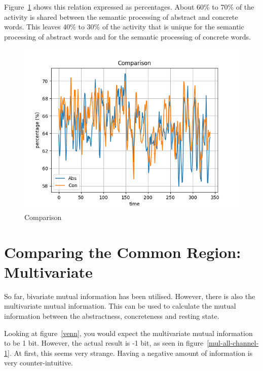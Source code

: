 Figure~\ref{comp-1} shows this relation expressed as percentages. About 60\% to 70\% of the activity is shared between the semantic processing of abstract and concrete words. This leaves 40\% to 30\% of the activity that is unique for the semantic processing of abstract words and for the semantic processing of concrete words.

\begin{figure}[!htb]
\caption{Comparison}
\label{comp-1}
    \centering
    \includegraphics[width=\textwidth]{fig/comp-1}
\end{figure}

\section{Comparing the Common Region: Multivariate}\label{analysis2}

So far, bivariate mutual information has been utilised. However, there is also the multivariate mutual information. This can be used to calculate the mutual information between the abstractness, concreteness and resting state. 

Looking at figure~\ref{venn}, you would expect the multivariate mutual information to be 1 bit. However, the actual result is -1 bit, as seen in figure~\ref{mul-all-channel-1}. At first, this seems very strange. Having a negative amount of information is very counter-intuitive.

